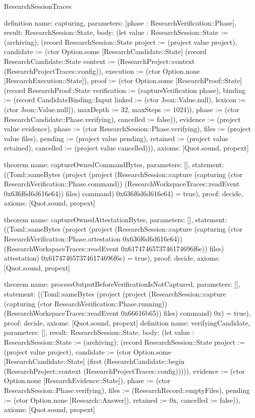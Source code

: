 \begin{lexlean}{ResearchSessionTraces}
\begin{semanticmodule}
definition{
 name: capturing,
 parameters: [phase : ResearchVerification::Phase],
 result: ResearchSession::State,
 body: (let value : ResearchSession::State := (archiving); (record ResearchSession::State {project := (project value project), candidate := (ctor Option.some [ResearchCandidate::State] (record ResearchCandidate::State {context := (ResearchProject::context (ResearchProjectTraces::config)), execution := (ctor Option.none [ResearchExecution::State]), proof := (ctor Option.some [ResearchProof::State] (record ResearchProof::State {verification := (captureVerification phase), binding := (record CandidateBinding::Input {linked := (ctor Json::Value.null), lexicon := (ctor Json::Value.null)}), maxDepth := 32, maxSteps := 1024})), phase := (ctor ResearchCandidate::Phase.verifying), cancelled := false})), evidence := (project value evidence), phase := (ctor ResearchSession::Phase.verifying), files := (project value files), pending := (project value pending), retained := (project value retained), cancelled := (project value cancelled)})),
 axioms: [Quot.sound, propext]
}

theorem{
 name: captureOwnedCommandBytes,
 parameters: [],
 statement: ((Toml::sameBytes (project (project (ResearchSession::capture (capturing (ctor ResearchVerification::Phase.command)) (ResearchWorkspaceTraces::readEvent 0x636f6d6d616e64)) files) command) 0x636f6d6d616e64) = true),
 proof: decide{},
 axioms: [Quot.sound, propext]
}

theorem{
 name: captureOwnedAttestationBytes,
 parameters: [],
 statement: ((Toml::sameBytes (project (project (ResearchSession::capture (capturing (ctor ResearchVerification::Phase.attestation 0x636f6d6d616e64)) (ResearchWorkspaceTraces::readEvent 0x6174746573746174696f6e)) files) attestation) 0x6174746573746174696f6e) = true),
 proof: decide{},
 axioms: [Quot.sound, propext]
}

theorem{
 name: processOutputBeforeVerificationIsNotCaptured,
 parameters: [],
 statement: ((Toml::sameBytes (project (project (ResearchSession::capture (capturing (ctor ResearchVerification::Phase.running)) (ResearchWorkspaceTraces::readEvent 0x66616b65)) files) command) 0x) = true),
 proof: decide{},
 axioms: [Quot.sound, propext]
}
definition{
 name: verifyingCandidate,
 parameters: [],
 result: ResearchSession::State,
 body: (let value : ResearchSession::State := (archiving); (record ResearchSession::State {project := (project value project), candidate := (ctor Option.some [ResearchCandidate::State] (first (ResearchCandidate::begin (ResearchProject::context (ResearchProjectTraces::config))))), evidence := (ctor Option.none [ResearchEvidence::State]), phase := (ctor ResearchSession::Phase.verifying), files := (ResearchRecord::emptyFiles), pending := (ctor Option.none [Research::Answer]), retained := 0x, cancelled := false})),
 axioms: [Quot.sound, propext]
}


\end{semanticmodule}
\end{lexlean}
